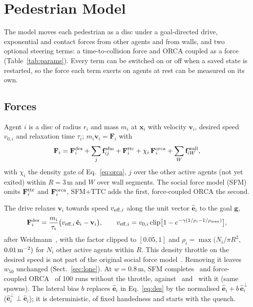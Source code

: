 \section{Pedestrian Model}\label{sec:model}

%
The model moves each pedestrian as a disc under a goal-directed drive, exponential and contact forces from other agents and from walls, and two optional steering terms: a time-to-collision force and ORCA coupled as a force (Table~\ref{tab:params}). Every term can be switched on or off when a saved state is restarted, so the force each term exerts on agents at rest can be measured on its own.

\subsection{Forces}
Agent $i$ is a disc of radius $r_i$ and mass $m_i$ at $\mathbf{x}_i$ with velocity $\mathbf{v}_i$, desired speed $v_{0,i}$ and relaxation time $\tau_i$; $m_i\dot{\mathbf{v}}_i=\mathbf{F}_i$ with
\begin{equation}\label{eq:force}
\mathbf{F}_i=\mathbf{F}^{\rm des}_i+\sum_{j}\mathbf{f}^{\rm sfm}_{ij}+\mathbf{F}^{\rm ttc}_i+\chi_i\,\mathbf{F}^{\rm orca}_i+\sum_{W}\mathbf{f}^{\rm wall}_{iW},
\end{equation}
with $\chi_i$ the density gate of Eq.~\eqref{eq:orca}, $j$ over the other active agents (not yet exited) within $R=3$\,m and $W$ over wall segments. The social force model (SFM) omits $\mathbf F^{\rm ttc}_i$ and $\mathbf F^{\rm orca}_i$, SFM+TTC adds the first, force-coupled ORCA the second.

The drive relaxes $\mathbf v_i$ towards speed $v_{{\rm eff},i}$ along the unit vector $\hat{\mathbf e}_i$ to the goal $\mathbf g$,
\begin{equation}\label{eq:des}
\mathbf{F}^{\rm des}_i=\frac{m_i}{\tau_i}\bigl(v_{{\rm eff},i}\,\hat{\mathbf e}_i-\mathbf v_i\bigr),\qquad
v_{{\rm eff},i}=v_{0,i}\,\mathrm{clip}\bigl[1-e^{-\gamma(1/\rho_i-1/\rho_{\max})}\bigr],
\end{equation}
after Weidmann~\cite{weidmann1993}, with the factor clipped to $[0.05,1]$ and $\rho_i=\max(N_i/\pi R^2,$ $0.01\,{\rm m}^{-2})$ for $N_i$ other active agents within $R$. This density throttle on the desired speed is not part of the original social force model~\cite{helbing1995,helbing2000nature}. Removing it leaves $w_{50}$ unchanged (Sect.~\ref{sec:lone}). At $w=0.8$\,m, SFM completes \RvBoneSfmOffK\ and force-coupled ORCA \RvBoneOrcaOffK\ of 100 runs without the throttle, against \RvBoneSfmOnK\ and \RvBoneOrcaOnK\ with it (same spawns). The lateral bias $b$ replaces $\hat{\mathbf e}_i$ in Eq.~\eqref{eq:des} by the normalised $\hat{\mathbf e}_i+b\,\hat{\mathbf e}^{\perp}_i$ ($\hat{\mathbf e}^{\perp}_i\perp\hat{\mathbf e}_i$); it is deterministic, of fixed handedness and starts with the quench.

